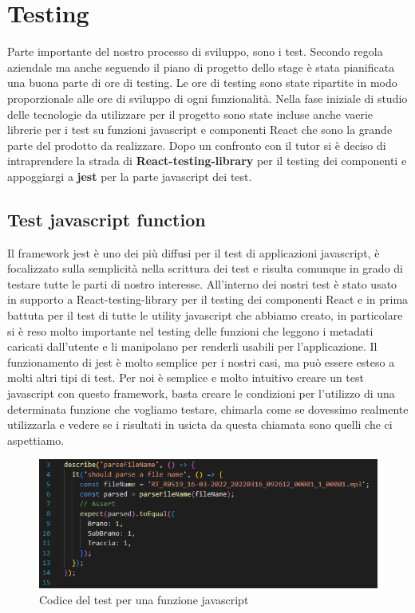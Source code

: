 \section{Testing}
Parte importante del nostro processo di sviluppo, sono i test. Secondo regola aziendale ma anche seguendo il piano di progetto dello stage è stata pianificata una buona parte di ore di testing. Le ore di
testing sono state ripartite in modo proporzionale alle ore di sviluppo di ogni funzionalità. Nella fase iniziale di studio delle tecnologie da utilizzare per il progetto sono state incluse anche vaerie librerie per
i test su funzioni javascript e componenti React che sono la grande parte del prodotto da realizzare. Dopo un confronto con il tutor si è deciso di intraprendere la strada di \textbf{React-testing-library} per il testing dei componenti
e appoggiargi a \textbf{jest} per la parte javascript dei test.

\subsection{Test javascript function}
Il framework jest è uno dei più diffusi per il test di applicazioni javascript, è focalizzato sulla semplicità nella scrittura dei test e risulta comunque in grado di testare tutte le parti di nostro interesse.
All'interno dei nostri test è stato usato in supporto a React-testing-library per il testing dei componenti React e in prima battuta per il test di tutte le utility javascript che abbiamo creato, in particolare si è reso molto importante
nel testing delle funzioni che leggono i metadati caricati dall'utente e li manipolano per renderli usabili per l'applicazione. Il funzionamento di jest è molto semplice per i nostri casi, ma può essere esteso a molti altri
tipi di test. Per noi è semplice e molto intuitivo creare un test javascript con questo framework, basta creare le condizioni per l'utilizzo di una determinata funzione che vogliamo testare, chimarla come se
dovessimo realmente utilizzarla e vedere se i risultati in usicta da questa chiamata sono quelli che ci aspettiamo.

\begin{figure}[H]
  \centering
  \includegraphics[width=\textwidth]{immagini/test-cronologia.png}
  \caption{Codice del test per una funzione javascript}
\end{figure}

